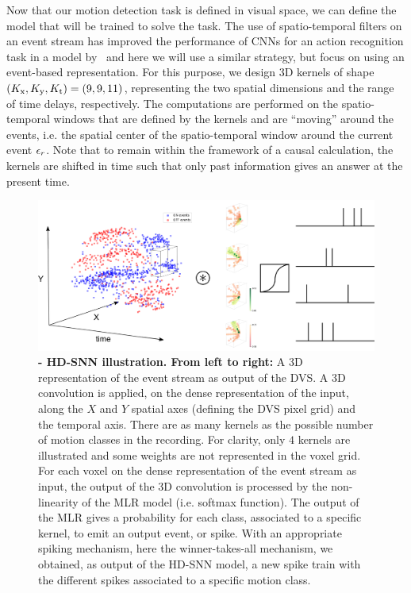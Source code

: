 \documentclass[default]{sn-jnl}%
\theoremstyle{thmstyleone}%
\theoremstyle{thmstyletwo}%
\theoremstyle{thmstylethree}%
\begin{document}
Now that our motion detection task is defined in visual space, we can define the model that will be trained to solve the task. The use of spatio-temporal filters on an event stream has improved the performance of CNNs for an action recognition task in a model by~\citet{ghosh_spatiotemporal_2019} and here we will use a similar strategy, but focus on using an event-based representation.
For this purpose, we design 3D kernels of shape $(K_\text{x}, K_\text{y}, K_\text{t}) = (9, 9, 11)$, representing the two spatial dimensions and the range of time delays, respectively.
The computations are performed on the spatio-temporal windows that are defined by the kernels and are ``moving'' around the events, i.e. the spatial center of the spatio-temporal window around the current event $\epsilon_r$. Note that to remain within the framework of a causal calculation, the kernels are shifted in time such that only past information gives an answer at the present time.
%
\begin{figure}%
    \centering
    \includegraphics[width=\linewidth]{figures/HD-SNN.png}
    \caption{
    \textbf{- HD-SNN illustration. From left to right:} A 3D representation of the event stream as output of the DVS. A 3D convolution is applied, on the dense representation of the input, along the $X$ and $Y$ spatial axes (defining the DVS pixel grid) and the temporal axis. There are as many kernels as the possible number of motion classes in the recording. For clarity, only $4$ kernels are illustrated and some weights are not represented in the voxel grid. For each voxel on the dense representation of the event stream as input, the output of the 3D convolution is processed by the non-linearity of the MLR model (i.e. softmax function). The output of the MLR gives a probability for each class, associated to a specific kernel, to emit an output event, or spike. With an appropriate spiking mechanism, here the winner-takes-all mechanism, we obtained, as output of the HD-SNN model, a new spike train with the different spikes associated to a specific motion class. }
    \label{fig:model}
\end{figure}
\end{document}
